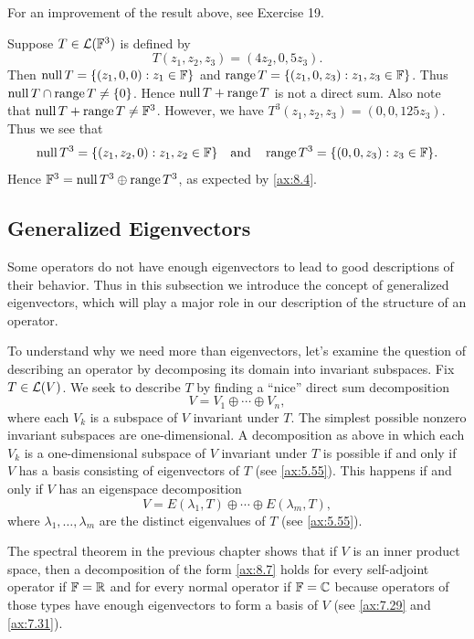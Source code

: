 For an improvement of the result above, see Exercise 19.

\begin{example}[$\F^3=\nul T^3\oplus\range T^3$ for $T\in\Lin(\F^3)$]\label{ax:8.6}
Suppose $T\in\Lin(\F^3)$ is defined by
\[ T(z_1,z_2,z_3) = (4z_2,0,5z_3). \]
Then $\operatorname{null} T=\{(z_1,0,0) : z_1\in\mathbb{F}\}$ and
$\operatorname{range} T=\{(z_1,0,z_3) : z_1,z_3\in\mathbb{F}\}$. Thus $\operatorname{null} T\cap\operatorname{range} T\ne\{0\}$.
Hence $\operatorname{null} T+\operatorname{range} T$ is not a direct sum. Also note that
$\operatorname{null} T+\operatorname{range} T\ne\mathbb{F}^3$. However, we have $T^3(z_1,z_2,z_3)=(0,0,125z_3)$.
Thus we see that
\[ \operatorname{null} T^3 = \{(z_1,z_2,0) : z_1,z_2\in\mathbb{F}\} \quad\text{and}\quad
   \operatorname{range} T^3 = \{(0,0,z_3) : z_3\in\mathbb{F}\}. \]
Hence $\F^3=\nul T^3\oplus\range T^3$, as expected by \ref{ax:8.4}.
\end{example}

\subsection{Generalized Eigenvectors}

Some operators do not have enough eigenvectors to lead to good descriptions of
their behavior. Thus in this subsection we introduce the concept of generalized
eigenvectors, which will play a major role in our description of the structure
of an operator.

To understand why we need more than eigenvectors, let's examine the question of
describing an operator by decomposing its domain into invariant subspaces. Fix
$T\in\mathcal{L}(V)$. We seek to describe $T$ by finding a ``nice'' direct sum
decomposition
\[ V = V_1\oplus\cdots\oplus V_n, \]
where each $V_k$ is a subspace of $V$ invariant under $T$. The simplest
possible nonzero invariant subspaces are one-dimensional. A decomposition as
above in which each $V_k$ is a one-dimensional subspace of $V$ invariant under
$T$ is possible if and only if $V$ has a basis consisting of eigenvectors of
$T$ (see \ref{ax:5.55}). This happens if and only if $V$ has an eigenspace
decomposition%
\[ V = E(\lambda_1,T)\oplus\cdots\oplus E(\lambda_m,T), \tag*{\thetheorem} \]
where $\lambda_1,\dots,\lambda_m$ are the distinct eigenvalues of $T$ (see
\ref{ax:5.55}).

The spectral theorem in the previous chapter shows that if $V$ is an inner
product space, then a decomposition of the form \ref{ax:8.7} holds for every
self-adjoint operator if $\mathbb{F}=\mathbb{R}$ and for every normal operator if $\mathbb{F}=\mathbb{C}$
because operators of those types have enough eigenvectors to form a basis of
$V$ (see \ref{ax:7.29} and \ref{ax:7.31}).

